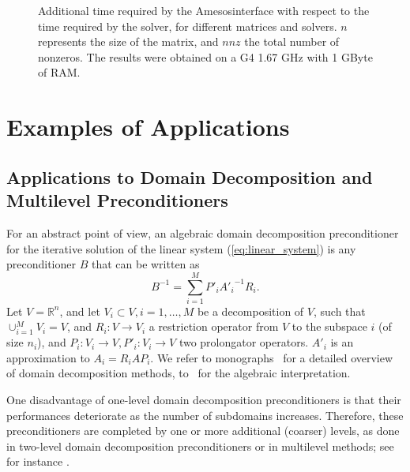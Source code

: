 \documentclass[acmtocl]{acmtrans2m}
\newcommand{\amesos}{{\sc Amesos}}
\begin{document}
\begin{figure}
\begin{center}
\caption{Additional time required by the \amesos interface with respect to the
time required by the solver, for different matrices and solvers. $n$
  represents the size of the matrix, and $nnz$ the total number of nonzeros.
The results were obtained on a G4 1.67 GHz with 1 GByte of RAM.}
\label{fig:results}
\end{center}
\end{figure}

\section{Examples of Applications}
\label{sec:example}

\subsection{Applications to Domain Decomposition and Multilevel Preconditioners}
\label{sec:preconditioner}

For an abstract point of view, an algebraic domain decomposition
preconditioner for the iterative solution of the linear system
(\ref{eq:linear_system})
is any preconditioner $B$ that can be written as
\begin{equation}
\label{eq:prec}
B^{-1} = \sum_{i=1}^M P'_i {A'_i}^{-1} R_i.
\end{equation}
Let $V = \mathbb{R}^n$, and
let $V_i \subset V, i = 1, \ldots, M$ be a decomposition of $V$, such that
$\cup_{i=1}^M V_i = V$, and $R_i: V \rightarrow V_i$ a restriction operator
from $V$ to the subspace $i$ (of size $n_i$),
and $P_i: V_i \rightarrow V, P'_i : V_i \rightarrow V$ two prolongator
operators. $A'_i$ is an approximation to $A_i = R_i A P_i$.  We refer to 
monographs~\cite{QV2,smith96parallel} for a detailed
overview of domain decomposition methods, to~\cite{saad96iterative} for the
algebraic interpretation.

One disadvantage of one-level domain decomposition preconditioners is that
their performances deteriorate as the number of subdomains increases.
Therefore, these preconditioners are completed by one or more additional
(coarser) levels, as done in two-level domain decomposition preconditioners or
in multilevel methods; 
see for instance \cite{brandt.classic,hack.book,hack2.book}. 
\end{document}

